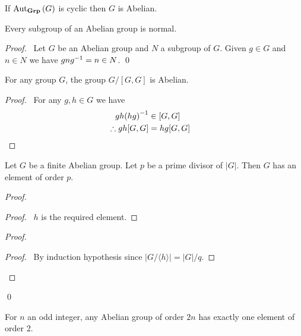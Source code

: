 \begin{cor}
If $\mathrm{Aut}_{\mathbf{Grp}} \left( {G} \right)$ is cyclic then $G$ is Abelian.
\end{cor}

\begin{prop}
Every subgroup of an Abelian group is normal.
\end{prop}

\begin{proof}
\pf\ Let $G$ be an Abelian group and $N$ a subgroup of $G$. Given $g \in G$ and $n \in N$ we have $gn{g}^{-1} = n \in N$. \qed
\end{proof}

\begin{prop}
For any group $G$, the group $G / [G,G]$ is Abelian.
\end{prop}

\begin{proof}
\pf\ For any $g,h \in G$ we have
\begin{align*}
gh{(hg)}^{-1} & \in [G,G] \\
\therefore gh[G,G] & = hg[G,G] & \relax
\end{align*}
\end{proof}

\begin{prop}
Let $G$ be a finite Abelian group. Let $p$ be a prime divisor of $|G|$. Then $G$ has an element of order $p$.
\end{prop}

\begin{proof}
\pf
{}
\begin{proof}
\pf\ $h$ is the required element.
\end{proof}
\begin{proof}
\begin{proof}
\pf\ By induction hypothesis since $|G / \langle h \rangle| = |G| / q$.
\end{proof}
\end{proof}
\qed
\end{proof}

\begin{cor}
For $n$ an odd integer, any Abelian group of order $2n$ has exactly one element of order 2.
\end{cor}

